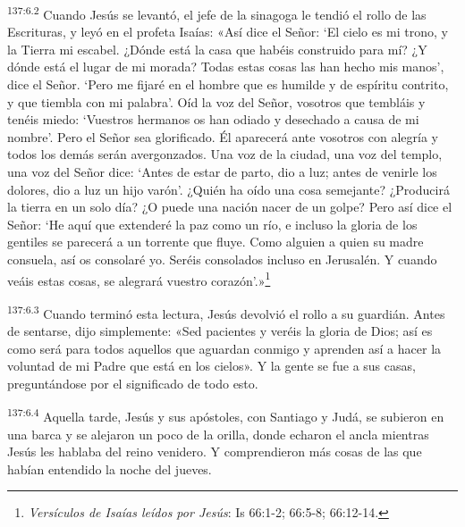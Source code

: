\par 
\textsuperscript{137:6.2} Cuando Jesús se levantó, el jefe de la sinagoga le tendió el rollo de las Escrituras, y leyó en el profeta Isaías: «Así dice el Señor: `El cielo es mi trono, y la Tierra mi escabel. ¿Dónde está la casa que habéis construido para mí? ¿Y dónde está el lugar de mi morada? Todas estas cosas las han hecho mis manos', dice el Señor. `Pero me fijaré en el hombre que es humilde y de espíritu contrito, y que tiembla con mi palabra'. Oíd la voz del Señor, vosotros que tembláis y tenéis miedo: `Vuestros hermanos os han odiado y desechado a causa de mi nombre'. Pero el Señor sea glorificado. Él aparecerá ante vosotros con alegría y todos los demás serán avergonzados. Una voz de la ciudad, una voz del templo, una voz del Señor dice: `Antes de estar de parto, dio a luz; antes de venirle los dolores, dio a luz un hijo varón'. ¿Quién ha oído una cosa semejante? ¿Producirá la tierra en un solo día? ¿O puede una nación nacer de un golpe? Pero así dice el Señor: `He aquí que extenderé la paz como un río, e incluso la gloria de los gentiles se parecerá a un torrente que fluye. Como alguien a quien su madre consuela, así os consolaré yo. Seréis consolados incluso en Jerusalén. Y cuando veáis estas cosas, se alegrará vuestro corazón'.»\footnote{\textit{Versículos de Isaías leídos por Jesús}: Is 66:1-2; 66:5-8; 66:12-14.}

\par 
\textsuperscript{137:6.3} Cuando terminó esta lectura, Jesús devolvió el rollo a su guardián. Antes de sentarse, dijo simplemente: «Sed pacientes y veréis la gloria de Dios; así es como será para todos aquellos que aguardan conmigo y aprenden así a hacer la voluntad de mi Padre que está en los cielos». Y la gente se fue a sus casas, preguntándose por el significado de todo esto.

\par 
\textsuperscript{137:6.4} Aquella tarde, Jesús y sus apóstoles, con Santiago y Judá, se subieron en una barca y se alejaron un poco de la orilla, donde echaron el ancla mientras Jesús les hablaba del reino venidero. Y comprendieron más cosas de las que habían entendido la noche del jueves.

